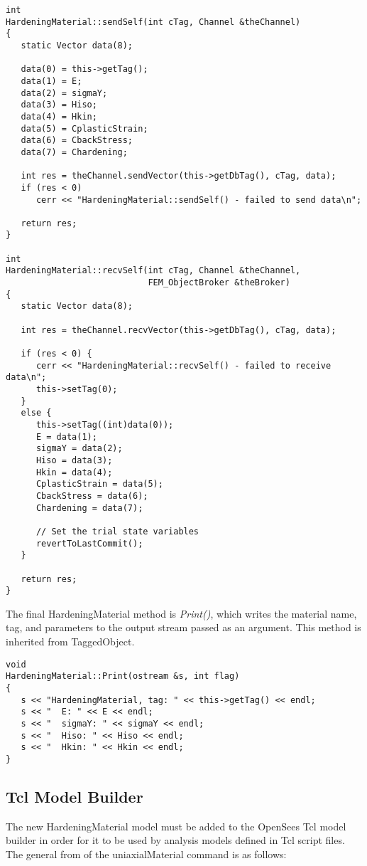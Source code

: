 \documentclass[12pt]{article}
\begin{document}
{\sf\small
\begin{verbatim}
int 
HardeningMaterial::sendSelf(int cTag, Channel &theChannel)
{
   static Vector data(8);
  
   data(0) = this->getTag();
   data(1) = E;
   data(2) = sigmaY;
   data(3) = Hiso;
   data(4) = Hkin;
   data(5) = CplasticStrain;
   data(6) = CbackStress;
   data(7) = Chardening;
  
   int res = theChannel.sendVector(this->getDbTag(), cTag, data);
   if (res < 0) 
      cerr << "HardeningMaterial::sendSelf() - failed to send data\n";

   return res;
}

int 
HardeningMaterial::recvSelf(int cTag, Channel &theChannel, 
                            FEM_ObjectBroker &theBroker)
{
   static Vector data(8);
   
   int res = theChannel.recvVector(this->getDbTag(), cTag, data);
  
   if (res < 0) {
      cerr << "HardeningMaterial::recvSelf() - failed to receive data\n";
      this->setTag(0);      
   }
   else {
      this->setTag((int)data(0));
      E = data(1);
      sigmaY = data(2);
      Hiso = data(3);
      Hkin = data(4);
      CplasticStrain = data(5);
      CbackStress = data(6);
      Chardening = data(7);

      // Set the trial state variables
      revertToLastCommit();
   }
    
   return res;
}
\end{verbatim}
}

\noindent The final HardeningMaterial method is {\em Print()}, which writes the material
name, tag, and parameters to the output stream passed as an argument. This method is
inherited from TaggedObject.

{\sf\small
\begin{verbatim}
void 
HardeningMaterial::Print(ostream &s, int flag)
{
   s << "HardeningMaterial, tag: " << this->getTag() << endl;
   s << "  E: " << E << endl;
   s << "  sigmaY: " << sigmaY << endl;
   s << "  Hiso: " << Hiso << endl;
   s << "  Hkin: " << Hkin << endl;
}
\end{verbatim}
}

\subsection{Tcl Model Builder}
The new HardeningMaterial model must be added to the OpenSees Tcl model builder in
order for it to be used by analysis models defined in Tcl script files. The general
from of the uniaxialMaterial command is as follows:
\end{document}
